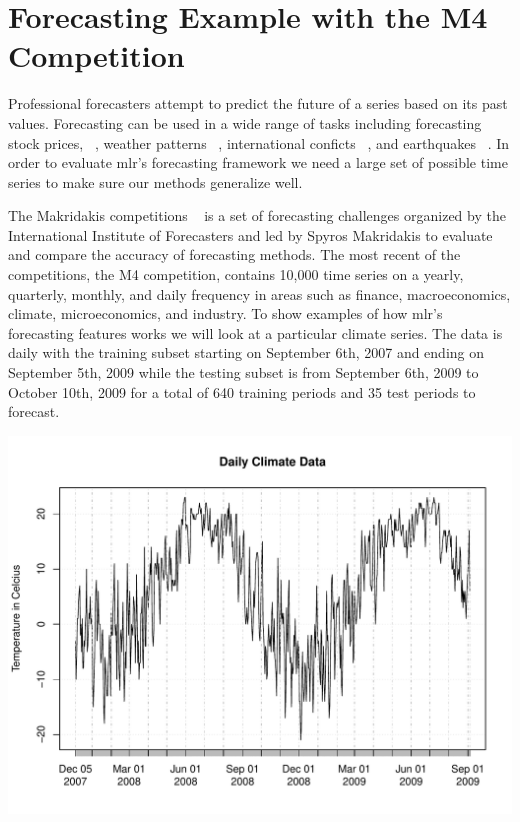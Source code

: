 \documentclass{article}\usepackage[]{graphicx}\usepackage[]{color}
\makeatletter
\def\maxwidth{ %
  \ifdim\Gin@nat@width>\linewidth
    \linewidth
  \else
    \Gin@nat@width
  \fi
}
\newenvironment{knitrout}{}{} %
\theoremstyle{definition}
\newcommand{\pkg}[1]{{\fontseries{b}\selectfont #1}}
\makeatother
\begin{document}
\section{Forecasting Example with the M4 Competition}
\label{sec:m4data}

Professional forecasters attempt to predict the future of a series based on its past values. Forecasting can be used in a wide range of tasks including forecasting stock prices, ~\cite{GRANGER19923}, weather patterns ~\cite{MurphymeteoForecast}, international conficts ~\cite{Chadefaux01012014}, and earthquakes ~\cite{earthquakeYegu}. In order to evaluate \pkg{mlr}'s forecasting framework we need a large set of possible time series to make sure our methods generalize well.

The Makridakis competitions ~\cite{Makridakis2000451} is a set of forecasting challenges organized by the International Institute of Forecasters and led by Spyros Makridakis to evaluate and compare the accuracy of forecasting methods. The most recent of the competitions, the M4 competition, contains 10,000 time series on a yearly, quarterly, monthly, and daily frequency in areas such as finance, macroeconomics, climate, microeconomics, and industry. To show examples of how \pkg{mlr}'s forecasting features works we will look at a particular climate series. The data is daily with the training subset starting on September 6th, 2007 and ending on September 5th, 2009 while the testing subset is from September 6th, 2009 to October 10th, 2009 for a total of 640 training periods and 35 test periods to forecast.


\begin{knitrout}
\color{fgcolor}

{\centering \includegraphics[width=\maxwidth]{figure/get_dat_weather-1} 

}



\end{knitrout}
\end{document}

